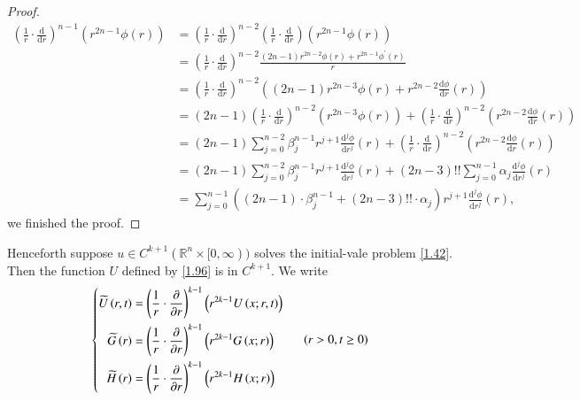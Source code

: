 \begin{proof}
$$
\begin{aligned}
\left( \frac{1}{r}\cdot \frac{\mathrm{d}}{\mathrm{d}r} \right) ^{n-1}\left( r^{2n-1}\phi \left( r \right) \right) &=\left( \frac{1}{r}\cdot \frac{\mathrm{d}}{\mathrm{d}r} \right) ^{n-2}\left( \frac{1}{r}\cdot \frac{\mathrm{d}}{\mathrm{d}r} \right) \left( r^{2n-1}\phi \left( r \right) \right) 
\\
&=\left( \frac{1}{r}\cdot \frac{\mathrm{d}}{\mathrm{d}r} \right) ^{n-2}\frac{\left( 2n-1 \right) r^{2n-2}\phi \left( r \right) +r^{2n-1}\phi ^{\prime}\left( r \right)}{r}
\\
&=\left( \frac{1}{r}\cdot \frac{\mathrm{d}}{\mathrm{d}r} \right) ^{n-2}\left( \left( 2n-1 \right) r^{2n-3}\phi \left( r \right) +r^{2n-2}\frac{\mathrm{d}\phi}{\mathrm{d}r}\left( r \right) \right) 
\\
&=\left( 2n-1 \right) \left( \frac{1}{r}\cdot \frac{\mathrm{d}}{\mathrm{d}r} \right) ^{n-2}\left( r^{2n-3}\phi \left( r \right) \right) +\left( \frac{1}{r}\cdot \frac{\mathrm{d}}{\mathrm{d}r} \right) ^{n-2}\left( r^{2n-2}\frac{\mathrm{d}\phi}{\mathrm{d}r}\left( r \right) \right) 
\\
&=\left( 2n-1 \right) \sum_{j=0}^{n-2}{\beta _{j}^{n-1}r^{j+1}\frac{\mathrm{d}^j\phi}{\mathrm{d}r^j}\left( r \right)}+\left( \frac{1}{r}\cdot \frac{\mathrm{d}}{\mathrm{d}r} \right) ^{n-2}\left( r^{2n-2}\frac{\mathrm{d}\phi}{\mathrm{d}r}\left( r \right) \right) 
\\
&=\left( 2n-1 \right) \sum_{j=0}^{n-2}{\beta _{j}^{n-1}r^{j+1}\frac{\mathrm{d}^j\phi}{\mathrm{d}r^j}\left( r \right)}+\left( 2n-3 \right) !!\sum_{j=0}^{n-1}{\alpha _j\frac{\mathrm{d}^j\phi}{\mathrm{d}r^j}\left( r \right)}
\\
&=\sum_{j=0}^{n-1}{\left( \left( 2n-1 \right) \cdot \beta _{j}^{n-1}+\left( 2n-3 \right) !!\cdot \alpha _j \right) r^{j+1}\frac{\mathrm{d}^j\phi}{\mathrm{d}r^j}\left( r \right)},
\end{aligned}
$$
we finished the proof.
\end{proof}
Henceforth suppose $u\in C^{k+1}(\mathbb{R}^n\times[0,\infty))$ solves the initial-vale problem \eqref{1.42}. Then the function $U$ defined by \eqref{1.96} is in $C^{k+1}$. We write 
\begin{equation}\label{1.50}
\left\{ \begin{aligned}
	\widetilde{U}\left( r,t \right) &=\left( \frac{1}{r}\cdot \frac{\partial}{\partial r} \right) ^{k-1}\left( r^{2k-1}U\left( x;r,t \right) \right)\\
	\widetilde{G}\left( r \right) &=\left( \frac{1}{r}\cdot \frac{\partial}{\partial r} \right) ^{k-1}\left( r^{2k-1}G\left( x;r \right) \right)\\
	\widetilde{H}\left( r \right) &=\left( \frac{1}{r}\cdot \frac{\partial}{\partial r} \right) ^{k-1}\left( r^{2k-1}H\left( x;r \right) \right)\\
\end{aligned} \right. \hspace{0.5cm}\left( r>0,t\ge 0 \right) 
\end{equation}

